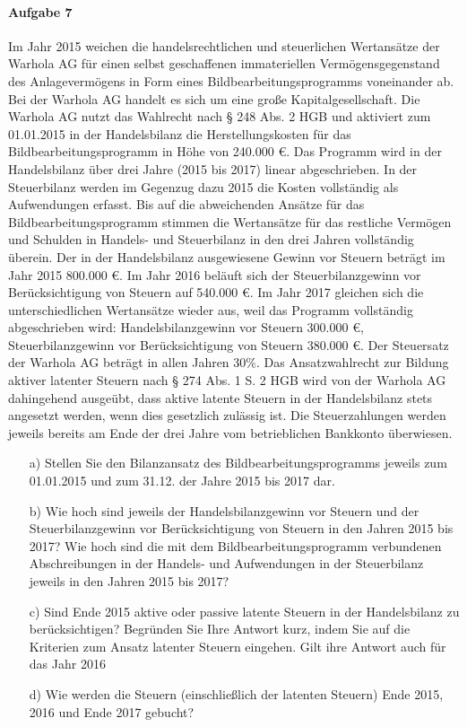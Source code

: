 \documentclass[paper=a4, fontsize=11pt]{scrartcl}
\numberwithin{equation}{section}
\numberwithin{figure}{section}
\numberwithin{table}{section}
\begin{document}
\paragraph{Aufgabe 7}
Im Jahr 2015 weichen die handelsrechtlichen und steuerlichen Wertansätze der Warhola AG für einen selbst geschaffenen immateriellen Vermögensgegenstand des Anlagevermögens in Form eines Bildbearbeitungsprogramms voneinander ab. Bei der Warhola AG handelt es sich um eine große Kapitalgesellschaft. Die Warhola AG nutzt das Wahlrecht nach § 248 Abs. 2 HGB und aktiviert zum 01.01.2015 in der Handelsbilanz die Herstellungskosten für das Bildbearbeitungsprogramm in Höhe von 240.000 €. Das Programm wird in der Handelsbilanz über drei Jahre (2015 bis 2017) linear abgeschrieben. In der Steuerbilanz werden im Gegenzug dazu 2015 die Kosten vollständig als Aufwendungen erfasst.  Bis auf die abweichenden Ansätze für das Bildbearbeitungsprogramm stimmen die Wertansätze für das restliche Vermögen und Schulden in Handels- und Steuerbilanz in den drei Jahren vollständig überein.
Der in der Handelsbilanz ausgewiesene Gewinn vor Steuern beträgt im Jahr 2015 800.000 €. Im Jahr 2016 beläuft sich der Steuerbilanzgewinn vor Berücksichtigung von Steuern auf 540.000 €. Im Jahr 2017 gleichen sich die unterschiedlichen Wertansätze wieder aus, weil das Programm vollständig abgeschrieben wird: Handelsbilanzgewinn vor Steuern 300.000 €, Steuerbilanzgewinn vor Berücksichtigung von Steuern 380.000 €. Der Steuersatz der Warhola AG beträgt in allen Jahren $30 \%$. Das Ansatzwahlrecht zur Bildung aktiver latenter Steuern nach § 274 Abs. 1 S. 2 HGB wird von der Warhola AG dahingehend ausgeübt, dass aktive latente Steuern in der Handelsbilanz stets angesetzt werden, wenn dies gesetzlich zulässig ist. Die Steuerzahlungen werden jeweils bereits am Ende der drei Jahre vom betrieblichen Bankkonto überwiesen. 
\begin{itemize}
\item[a)] Stellen Sie den Bilanzansatz des Bildbearbeitungsprogramms jeweils zum 01.01.2015 und zum 31.12. der Jahre 2015 bis 2017 dar. 
\item[b)] Wie hoch sind jeweils der Handelsbilanzgewinn vor Steuern und der Steuerbilanzgewinn vor Berücksichtigung von Steuern in den Jahren 2015 bis 2017? Wie hoch sind die mit dem Bildbearbeitungsprogramm verbundenen Abschreibungen in der Handels- und Aufwendungen in der Steuerbilanz jeweils in den Jahren 2015 bis 2017? 
\item[c)] Sind Ende 2015 aktive oder passive latente Steuern in der Handelsbilanz zu berücksichtigen? Begründen Sie Ihre Antwort kurz, indem Sie auf die Kriterien zum Ansatz latenter Steuern eingehen. Gilt ihre Antwort auch für das Jahr 2016
\item[d)] Wie werden die Steuern (einschließlich der latenten Steuern) Ende 2015, 2016 und Ende 2017 gebucht? 
\end{itemize}
\end{document}
